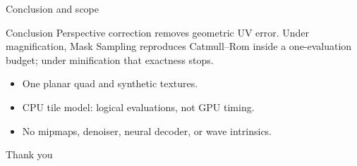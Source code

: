 \documentclass[aspectratio=169]{beamer}
\begin{document}
\begin{frame}{Conclusion and scope}
\begin{block}{Conclusion}
Perspective correction removes geometric UV error. Under magnification, Mask Sampling reproduces Catmull--Rom inside a one-evaluation budget; under minification that exactness stops.
\end{block}
\begin{itemize}
\item One planar quad and synthetic textures.
\item CPU tile model: logical evaluations, not GPU timing.
\item No mipmaps, denoiser, neural decoder, or wave intrinsics.
\end{itemize}
\vfill\centering Thank you
\end{frame}
\end{document}
